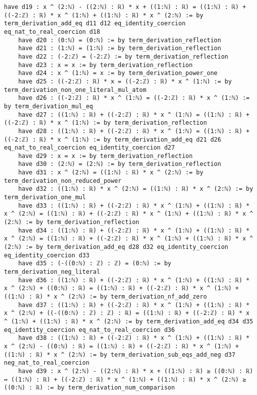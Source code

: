 \documentclass{article}
\begin{document}
\begin{tcolorbox}[colback=white!10, width=\linewidth]
\begin{lstlisting}[language=Lean4]
    have d19 : x ^ (2:ℕ) - ((2:ℕ) : ℝ) * x + ((1:ℕ) : ℝ) = ((1:ℕ) : ℝ) + ((-2:ℤ) : ℝ) * x ^ (1:ℕ) + ((1:ℕ) : ℝ) * x ^ (2:ℕ) := by term_derivation_add_eq d11 d12 eq_identity_coercion eq_nat_to_real_coercion d18
    have d20 : (0:ℕ) = (0:ℕ) := by term_derivation_reflection
    have d21 : (1:ℕ) = (1:ℕ) := by term_derivation_reflection
    have d22 : (-2:ℤ) = (-2:ℤ) := by term_derivation_reflection
    have d23 : x = x := by term_derivation_reflection
    have d24 : x ^ (1:ℕ) = x := by term_derivation_power_one
    have d25 : ((-2:ℤ) : ℝ) * x = ((-2:ℤ) : ℝ) * x ^ (1:ℕ) := by term_derivation_non_one_literal_mul_atom
    have d26 : ((-2:ℤ) : ℝ) * x ^ (1:ℕ) = ((-2:ℤ) : ℝ) * x ^ (1:ℕ) := by term_derivation_mul_eq
    have d27 : ((1:ℕ) : ℝ) + ((-2:ℤ) : ℝ) * x ^ (1:ℕ) = ((1:ℕ) : ℝ) + ((-2:ℤ) : ℝ) * x ^ (1:ℕ) := by term_derivation_reflection
    have d28 : ((1:ℕ) : ℝ) + ((-2:ℤ) : ℝ) * x ^ (1:ℕ) = ((1:ℕ) : ℝ) + ((-2:ℤ) : ℝ) * x ^ (1:ℕ) := by term_derivation_add_eq d21 d26 eq_nat_to_real_coercion eq_identity_coercion d27
    have d29 : x = x := by term_derivation_reflection
    have d30 : (2:ℕ) = (2:ℕ) := by term_derivation_reflection
    have d31 : x ^ (2:ℕ) = ((1:ℕ) : ℝ) * x ^ (2:ℕ) := by term_derivation_non_reduced_power
    have d32 : ((1:ℕ) : ℝ) * x ^ (2:ℕ) = ((1:ℕ) : ℝ) * x ^ (2:ℕ) := by term_derivation_one_mul
    have d33 : ((1:ℕ) : ℝ) + ((-2:ℤ) : ℝ) * x ^ (1:ℕ) + ((1:ℕ) : ℝ) * x ^ (2:ℕ) = ((1:ℕ) : ℝ) + ((-2:ℤ) : ℝ) * x ^ (1:ℕ) + ((1:ℕ) : ℝ) * x ^ (2:ℕ) := by term_derivation_reflection
    have d34 : ((1:ℕ) : ℝ) + ((-2:ℤ) : ℝ) * x ^ (1:ℕ) + ((1:ℕ) : ℝ) * x ^ (2:ℕ) = ((1:ℕ) : ℝ) + ((-2:ℤ) : ℝ) * x ^ (1:ℕ) + ((1:ℕ) : ℝ) * x ^ (2:ℕ) := by term_derivation_add_eq d28 d32 eq_identity_coercion eq_identity_coercion d33
    have d35 : (-((0:ℕ) : ℤ) : ℤ) = (0:ℕ) := by term_derivation_neg_literal
    have d36 : ((1:ℕ) : ℝ) + ((-2:ℤ) : ℝ) * x ^ (1:ℕ) + ((1:ℕ) : ℝ) * x ^ (2:ℕ) + ((0:ℕ) : ℝ) = ((1:ℕ) : ℝ) + ((-2:ℤ) : ℝ) * x ^ (1:ℕ) + ((1:ℕ) : ℝ) * x ^ (2:ℕ) := by term_derivation_nf_add_zero
    have d37 : ((1:ℕ) : ℝ) + ((-2:ℤ) : ℝ) * x ^ (1:ℕ) + ((1:ℕ) : ℝ) * x ^ (2:ℕ) + ((-((0:ℕ) : ℤ) : ℤ) : ℝ) = ((1:ℕ) : ℝ) + ((-2:ℤ) : ℝ) * x ^ (1:ℕ) + ((1:ℕ) : ℝ) * x ^ (2:ℕ) := by term_derivation_add_eq d34 d35 eq_identity_coercion eq_nat_to_real_coercion d36
    have d38 : ((1:ℕ) : ℝ) + ((-2:ℤ) : ℝ) * x ^ (1:ℕ) + ((1:ℕ) : ℝ) * x ^ (2:ℕ) - ((0:ℕ) : ℝ) = ((1:ℕ) : ℝ) + ((-2:ℤ) : ℝ) * x ^ (1:ℕ) + ((1:ℕ) : ℝ) * x ^ (2:ℕ) := by term_derivation_sub_eqs_add_neg d37 neg_nat_to_real_coercion
    have d39 : x ^ (2:ℕ) - ((2:ℕ) : ℝ) * x + ((1:ℕ) : ℝ) ≥ ((0:ℕ) : ℝ) ↔ ((1:ℕ) : ℝ) + ((-2:ℤ) : ℝ) * x ^ (1:ℕ) + ((1:ℕ) : ℝ) * x ^ (2:ℕ) ≥ ((0:ℕ) : ℝ) := by term_derivation_num_comparison

\end{lstlisting}
\end{tcolorbox}
\end{document}
